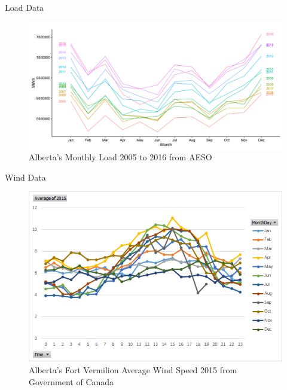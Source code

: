 \documentclass[newPxFont,numfooter,progressbar,sectionpages]{beamer}
\begin{document}
\begin{frame}[c]{Load Data}

\begin{figure}
	\centering
	\includegraphics[width=0.9\linewidth]{"figure/monthLoad"}
	\caption{Alberta’s Monthly Load 2005 to 2016 from AESO}
	\label{fig:monthLoad}
\end{figure}



\end{frame}




\begin{frame}[c]{Wind Data}

\begin{figure}
	\centering
	\includegraphics[width=0.9\linewidth]{"figure/fortVermilion"}
	\caption{Alberta’s Fort Vermilion Average Wind Speed 2015 from Government of Canada}
	\label{fig:wind}
\end{figure}



\end{frame}
\end{document}
